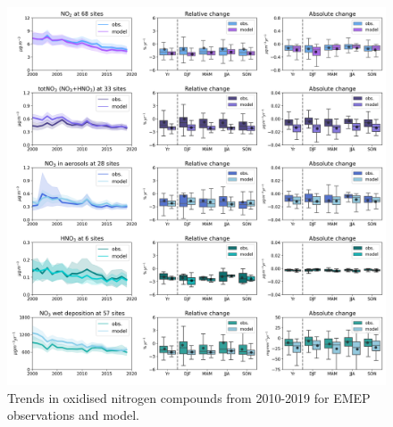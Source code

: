 \begin{figure}
	\centering
	\includegraphics[width=0.74\paperwidth]{FIGS_TRENDS/Nox_trends.png}
	\caption{\label{fig:NOx_trends}Trends in oxidised nitrogen compounds from 2010-2019 for EMEP observations and model.}
\end{figure}


